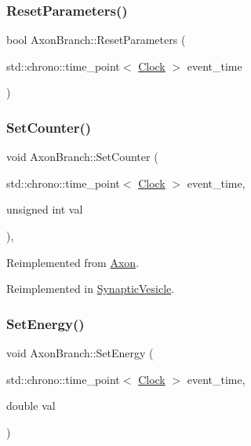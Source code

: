 \mbox{\label{classAxonBranch_a195d68dffd37317db3f94e1b4c8f73c7}} 
\subsubsection{\texorpdfstring{Reset\+Parameters()}{ResetParameters()}}
{\footnotesize\ttfamily bool Axon\+Branch\+::\+Reset\+Parameters (\begin{DoxyParamCaption}\item[{std\+::chrono\+::time\+\_\+point$<$ \mbox{\hyperlink{universe_8h_a0ef8d951d1ca5ab3cfaf7ab4c7a6fd80}{Clock}} $>$}]{event\+\_\+time }\end{DoxyParamCaption})}

\mbox{\label{classAxonBranch_a96ba30b18627563d637d4e02fac943be}} 
\subsubsection{\texorpdfstring{Set\+Counter()}{SetCounter()}}
{\footnotesize\ttfamily void Axon\+Branch\+::\+Set\+Counter (\begin{DoxyParamCaption}\item[{std\+::chrono\+::time\+\_\+point$<$ \mbox{\hyperlink{universe_8h_a0ef8d951d1ca5ab3cfaf7ab4c7a6fd80}{Clock}} $>$}]{event\+\_\+time,  }\item[{unsigned int}]{val }\end{DoxyParamCaption})\hspace{0.3cm}{\ttfamily [inline]}, {\ttfamily [virtual]}}



Reimplemented from \mbox{\hyperlink{classAxon_a3493cb97bde26bd66facc6084cd5f219}{Axon}}.



Reimplemented in \mbox{\hyperlink{classSynapticVesicle_a7fd7cfce5eccb904206d968866f85220}{Synaptic\+Vesicle}}.

\mbox{\label{classAxonBranch_a6918dcaf6d9325a1a22a2e6c65ad5dab}} 
\subsubsection{\texorpdfstring{Set\+Energy()}{SetEnergy()}}
{\footnotesize\ttfamily void Axon\+Branch\+::\+Set\+Energy (\begin{DoxyParamCaption}\item[{std\+::chrono\+::time\+\_\+point$<$ \mbox{\hyperlink{universe_8h_a0ef8d951d1ca5ab3cfaf7ab4c7a6fd80}{Clock}} $>$}]{event\+\_\+time,  }\item[{double}]{val }\end{DoxyParamCaption})\hspace{0.3cm}{\ttfamily [inline]}}

